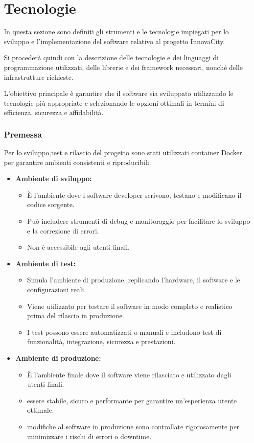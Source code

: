 \section{Tecnologie}
In questa sezione sono definiti gli strumenti e le tecnologie impiegati per lo sviluppo e l'implementazione del software relativo al progetto InnovaCity.

Si procederà quindi con la descrizione delle tecnologie e dei linguaggi di programmazione utilizzati, delle librerie e dei framework necessari, nonché delle infrastrutture richieste.

L'obiettivo principale è garantire che il software sia sviluppato utilizzando le tecnologie più appropriate e selezionando le opzioni ottimali in termini di efficienza, sicurezza e affidabilità.

\subsubsection*{Premessa}
Per lo sviluppo,test e rilascio del progetto sono stati utilizzati container Docker per garantire ambienti consistenti e riproducibili.
\begin{itemize}
  \item \textbf{Ambiente di sviluppo:}
    \begin{itemize}
      \item È l'ambiente dove i software developer scrivono, testano e modificano il codice sorgente.
      \item Può includere strumenti di debug e monitoraggio per facilitare lo sviluppo e la correzione di errori.
      \item Non è accessibile agli utenti finali.
    \end{itemize}
    \item \textbf{Ambiente di test:}
    \begin{itemize}
      \item Simula l'ambiente di produzione, replicando l'hardware, il software e le configurazioni reali.
      \item Viene utilizzato per testare il software in modo completo e realistico prima del rilascio in produzione.
      \item I test possono essere automatizzati o manuali e includono test di funzionalità, integrazione, sicurezza e prestazioni.
    \end{itemize}
    \item \textbf{Ambiente di produzione:}
    \begin{itemize}
      \item È l'ambiente finale dove il software viene rilasciato e utilizzato dagli utenti finali.
      \item essere stabile, sicuro e performante per garantire un'esperienza utente ottimale.
      \item modifiche al software in produzione sono controllate rigorosamente per minimizzare i rischi di errori o downtime.
    \end{itemize}
\end{itemize}




